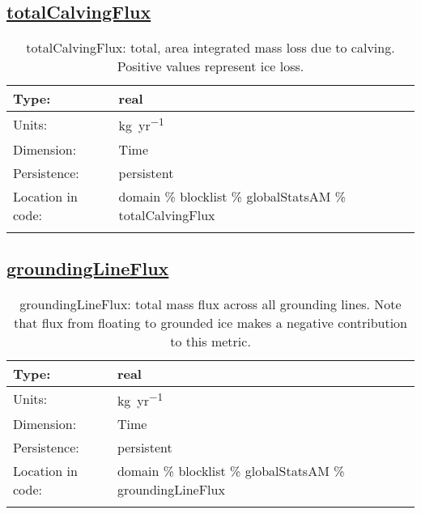 \subsection[totalCalvingFlux]{\hyperref[sec:var_tab_globalStatsAM]{totalCalvingFlux}}
\label{subsec:var_sec_globalStatsAM_totalCalvingFlux}
\begin{center}
\begin{longtable}{| p{2.0in} | p{4.0in} |}
        \hline 
        Type: & real \\
        \hline 
        Units: & \si{kg.yr^{-1}} \\
        \hline 
        Dimension: & Time \\
        \hline 
        Persistence: & persistent \\
        \hline 
         Location in code: & domain \% blocklist \% globalStatsAM \% totalCalvingFlux \\
         \hline 
    \caption{totalCalvingFlux: total, area integrated mass loss due to calving. Positive values represent ice loss.}
\end{longtable}
\end{center}
\subsection[groundingLineFlux]{\hyperref[sec:var_tab_globalStatsAM]{groundingLineFlux}}
\label{subsec:var_sec_globalStatsAM_groundingLineFlux}
\begin{center}
\begin{longtable}{| p{2.0in} | p{4.0in} |}
        \hline 
        Type: & real \\
        \hline 
        Units: & \si{kg.yr^{-1}} \\
        \hline 
        Dimension: & Time \\
        \hline 
        Persistence: & persistent \\
        \hline 
         Location in code: & domain \% blocklist \% globalStatsAM \% groundingLineFlux \\
         \hline 
    \caption{groundingLineFlux: total mass flux across all grounding lines.  Note that flux from floating to grounded ice makes a negative contribution to this metric.}
\end{longtable}
\end{center}
